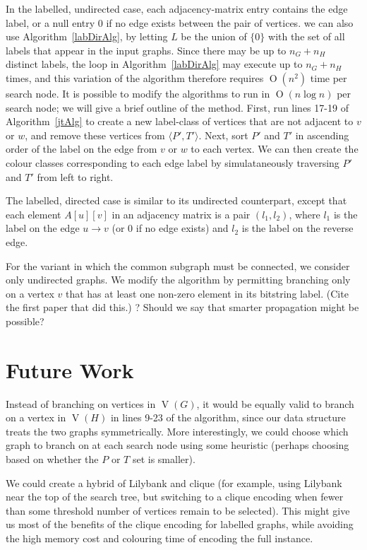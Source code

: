 \documentclass[letterpaper]{article}
\DeclareMathOperator{\V}{V}
\newcommand{\BigO}[1]{\ensuremath{\operatorname{O}\left(#1\right)}}
\begin{document}
In the labelled, undirected case, each adjacency-matrix entry contains the edge
label, or a null entry 0 if no edge exists between the pair of vertices.  we
can also use Algorithm~\ref{labDirAlg}, by letting $L$ be the union of $\{0\}$
with the set of all labels that appear in the input graphs. Since there may be
up to $n_G + n_H$ distinct labels, the loop in Algorithm~\ref{labDirAlg} may
execute up to $n_G + n_H$ times, and this variation of the algorithm therefore
requires $\BigO{n^2}$ time per search node.  It is possible to modify the
algorithms to run in $\BigO{n \log n}$ per search node; we will give a brief
outline of the method. First, run lines 17-19 of Algorithm~\ref{jtAlg} to
create a new label-class of vertices that are not adjacent to $v$ or $w$, and
remove these vertices from $\langle P',T' \rangle$. Next, sort $P'$ and $T'$ in
ascending order of the label on the edge from $v$ or $w$ to each vertex. We can
then create the colour classes corresponding to each edge label by
simulataneously traversing $P'$ and $T'$ from left to right.

The labelled, directed case is similar to its undirected counterpart, except that
each element $A[u][v]$ in an adjacency matrix is a pair $(l_1, l_2)$, where
$l_1$ is the label on the edge $u \rightarrow v$ (or 0 if no edge exists) and $l_2$
is the label on the reverse edge.

For the variant in which the common subgraph must be connected, we consider
only undirected graphs. We modify the algorithm by permitting branching only on
a vertex $v$ that has at least one non-zero element in its bitstring label.
(Cite the first paper that did this.) ? Should we say that smarter propagation
might be possible?

\section{Future Work}

Instead of branching on vertices in $\V(G)$, it would be equally valid to branch on
a vertex in $\V(H)$ in lines 9-23 of the algorithm, since our data structure treats the
two graphs symmetrically. More interestingly, we could choose which graph to branch on
at each search node using some heuristic (perhaps choosing based on whether the $P$ or
$T$ set is smaller).

We could create a hybrid of Lilybank and clique (for example, using Lilybank near the
top of the search tree, but switching to a clique encoding when fewer than some threshold
number of vertices remain to be selected). This might give us most of the benefits of
the clique encoding for labelled graphs, while avoiding the high memory cost and colouring
time of encoding the full instance.
\end{document}
